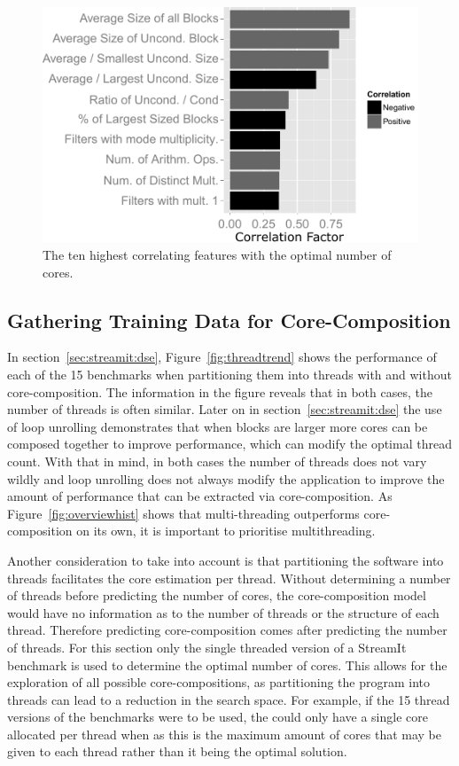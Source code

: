 
\begin{figure}[t]
\centering
  \includegraphics[width=1\textwidth]{streamit-paper/graphics/corrGraph_remix.pdf}
  \caption{The ten highest correlating features with the optimal number of cores.}\label{fig:corrCore}
\end{figure}


\subsection{Gathering Training Data for Core-Composition}
In section~\ref{sec:streamit:dse}, Figure~\ref{fig:threadtrend} shows the performance of each of the 15 benchmarks when partitioning them into threads with and without core-composition.
The information in the figure reveals that in both cases, the number of threads is often similar.
Later on in section~\ref{sec:streamit:dse} the use of loop unrolling demonstrates that when blocks are larger more cores can be composed together to improve performance, which can modify the optimal thread count.
With that in mind, in both cases the number of threads does not vary wildly and loop unrolling does not always modify the application to improve the amount of performance that can be extracted via core-composition.
As Figure~\ref{fig:overviewhist} shows that multi-threading outperforms core-composition on its own, it is important to prioritise multithreading.

Another consideration to take into account is that partitioning the software into threads facilitates the core estimation per thread.
Without determining a number of threads before predicting the number of cores, the core-composition model would have no information as to the number of threads or the structure of each thread.
Therefore predicting core-composition comes after predicting the number of threads.
For this section only the single threaded version of a StreamIt benchmark is used to determine the optimal number of cores.
This allows for the exploration of all possible core-compositions, as partitioning the program into threads can lead to a reduction in the search space.
For example, if the 15 thread versions of the benchmarks were to be used, the could only have a single core allocated per thread when as this is the maximum amount of cores that may be given to each thread rather than it being the optimal solution.

